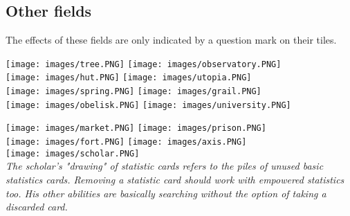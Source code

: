 \documentclass[12pt]{article}
\begin{document}
\subsection*{Other fields}
The effects of these fields are only indicated by a question mark on their tiles.\par
\texttt{[image: images/tree.PNG]}
\texttt{[image: images/observatory.PNG]}\\
\texttt{[image: images/hut.PNG]}
\texttt{[image: images/utopia.PNG]}\\
\texttt{[image: images/spring.PNG]}
\texttt{[image: images/grail.PNG]}\\
\texttt{[image: images/obelisk.PNG]}
\texttt{[image: images/university.PNG]}

\clearpage
\texttt{[image: images/market.PNG]}
\texttt{[image: images/prison.PNG]}\\
\texttt{[image: images/fort.PNG]}
\texttt{[image: images/axis.PNG]}\\
\texttt{[image: images/scholar.PNG]}\\
\textit{The scholar's "drawing" of statistic cards refers to the piles of unused basic statistics cards. Removing a statistic card should work with empowered statistics too. His other abilities are basically searching without the option of taking a discarded card.}
\clearpage
\end{document}
